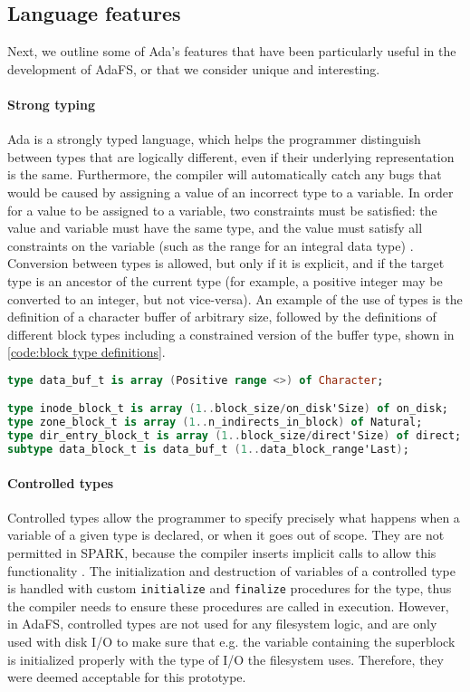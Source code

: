 \subsection{Language features}
Next, we outline some of Ada's features that have been particularly useful in the development of AdaFS, or that we consider unique and interesting.

\paragraph{Strong typing}
Ada is a strongly typed language, which helps the programmer distinguish between types that are logically different, even if their underlying representation is the same.
Furthermore, the compiler will automatically catch any bugs that would be caused by assigning a value of an incorrect type to a variable.
In order for a value to be assigned to a variable, two constraints must be satisfied: the value and variable must have the same type, and the value must satisfy all constraints on the variable (such as the range for an integral data type) \cite{barnes2014}.
Conversion between types is allowed, but only if it is explicit, and if the target type is an ancestor of the current type (for example, a positive integer may be converted to an integer, but not vice-versa).
An example of the use of types is the definition of a character buffer of arbitrary size, followed by the definitions of different block types including a constrained version of the buffer type, shown in \autoref{code:block type definitions}.

\begin{lstlisting}[float=tb,caption={Block type definitions}, label={code:block type definitions}, language=Ada]
type data_buf_t is array (Positive range <>) of Character;

type inode_block_t is array (1..block_size/on_disk'Size) of on_disk;
type zone_block_t is array (1..n_indirects_in_block) of Natural;
type dir_entry_block_t is array (1..block_size/direct'Size) of direct;
subtype data_block_t is data_buf_t (1..data_block_range'Last);
\end{lstlisting}

\paragraph{Controlled types}
Controlled types allow the programmer to specify precisely what happens when a variable of a given type is declared, or when it goes out of scope.
They are not permitted in SPARK, because the compiler inserts implicit calls to allow this functionality \cite{sparkRM}.
The initialization and destruction of variables of a controlled type is handled with custom \lstinline[language=Ada]{initialize} and \lstinline[language=Ada]{finalize} procedures for the type, thus the compiler needs to ensure these procedures are called in execution.
However, in AdaFS, controlled types are not used for any filesystem logic, and are only used with disk I/O to make sure that e.g. the variable containing the superblock is initialized properly with the type of I/O the filesystem uses.
Therefore, they were deemed acceptable for this prototype.

